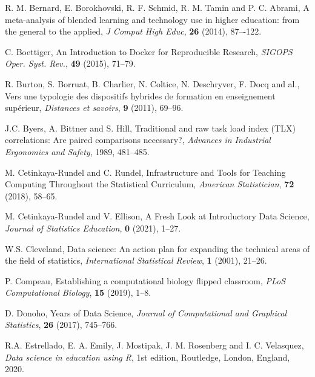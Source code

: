 \documentclass{aims} %
\theoremstyle{definition}
\begin{document}
\begin{thebibliography}{99}
     \newblock  R. M. Bernard, E. Borokhovski, R. F. Schmid, R. M. Tamin and P. C. Abrami,
     \newblock A meta-analysis of blended learning and technology use in higher education: from the general to the applied,
     \newblock \emph{J Comput High Educ}, \textbf{26} (2014), 87–-122.

     \newblock  C. Boettiger,
     \newblock An Introduction to Docker for Reproducible Research,
     \newblock \emph{SIGOPS Oper. Syst. Rev.}, \textbf{49} (2015), 71--79.

     \newblock  R. Burton, S. Borruat, B. Charlier, N. Coltice, N. Deschryver, F. Docq and al.,
     \newblock Vers une typologie des dispositifs hybrides de formation en enseignement supérieur,
     \newblock \emph{Distances et savoirs}, \textbf{9} (2011), 69--96.

     \newblock  J.C. Byers, A. Bittner and S. Hill,
     \newblock Traditional and raw task load index (TLX) correlations: Are paired comparisons necessary?,
     \newblock \emph{Advances in Industrial Ergonomics and Safety}, 1989, 481--485.

     \newblock  M. Cetinkaya-Rundel and C. Rundel,
     \newblock Infrastructure and Tools for Teaching Computing Throughout the Statistical Curriculum,
     \newblock \emph{American Statistician}, \textbf{72} (2018), 58--65.

     \newblock  M. Cetinkaya-Rundel and V. Ellison,
     \newblock A Fresh Look at Introductory Data Science,
     \newblock \emph{Journal of Statistics Education}, \textbf{0} (2021), 1--27.

     \newblock W.S. Cleveland,
     \newblock Data science: An action plan for expanding the technical areas of the field of statistics,
     \newblock \emph{International Statistical Review}, \textbf{1} (2001), 21--26.

     \newblock P. Compeau,
     \newblock Establishing a computational biology flipped classroom,
     \newblock \emph{PLoS Computational Biology}, \textbf{15} (2019), 1--8.

     \newblock  D. Donoho,
      Years of Data Science,
     \newblock \emph{Journal of Computational and Graphical Statistics}, \textbf{26} (2017), 745--766.

     \newblock R.A. Estrellado, E. A. Emily, J. Mostipak, J. M. Rosenberg and I. C. Velasquez,
     \newblock \emph{Data science in education using R},
     \newblock 1st edition, Routledge, London, England, 2020.


\end{thebibliography}
\end{document}
